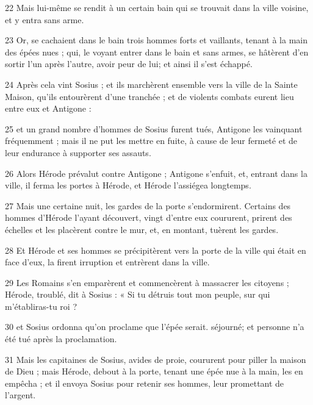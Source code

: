 \par 22 Mais lui-même se rendit à un certain bain qui se trouvait dans la ville voisine, et y entra sans arme.

\par 23 Or, se cachaient dans le bain trois hommes forts et vaillants, tenant à la main des épées nues ; qui, le voyant entrer dans le bain et sans armes, se hâtèrent d'en sortir l'un après l'autre, avoir peur de lui; et ainsi il s'est échappé.

\par 24 Après cela vint Sosius ; et ils marchèrent ensemble vers la ville de la Sainte Maison, qu'ils entourèrent d'une tranchée ; et de violents combats eurent lieu entre eux et Antigone :

\par 25 et un grand nombre d'hommes de Sosius furent tués, Antigone les vainquant fréquemment ; mais il ne put les mettre en fuite, à cause de leur fermeté et de leur endurance à supporter ses assauts.

\par 26 Alors Hérode prévalut contre Antigone ; Antigone s'enfuit, et, entrant dans la ville, il ferma les portes à Hérode, et Hérode l'assiégea longtemps.

\par 27 Mais une certaine nuit, les gardes de la porte s'endormirent. Certains des hommes d'Hérode l'ayant découvert, vingt d'entre eux coururent, prirent des échelles et les placèrent contre le mur, et, en montant, tuèrent les gardes.

\par 28 Et Hérode et ses hommes se précipitèrent vers la porte de la ville qui était en face d'eux, la firent irruption et entrèrent dans la ville.

\par 29 Les Romains s'en emparèrent et commencèrent à massacrer les citoyens ; Hérode, troublé, dit à Sosius : « Si tu détruis tout mon peuple, sur qui m'établiras-tu roi ?

\par 30 et Sosius ordonna qu'on proclame que l'épée serait. séjourné; et personne n’a été tué après la proclamation.

\par 31 Mais les capitaines de Sosius, avides de proie, coururent pour piller la maison de Dieu ; mais Hérode, debout à la porte, tenant une épée nue à la main, les en empêcha ; et il envoya Sosius pour retenir ses hommes, leur promettant de l'argent.

